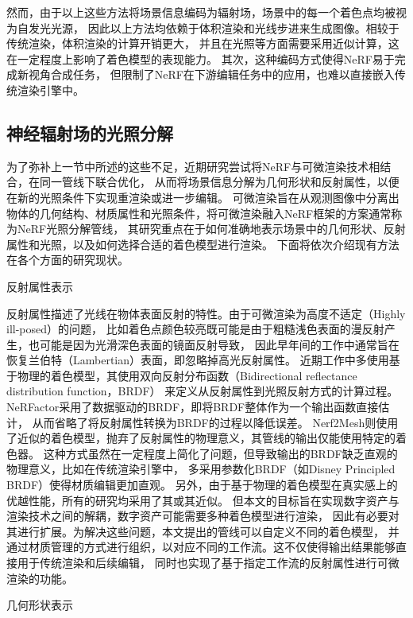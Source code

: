 然而，由于以上这些方法将场景信息编码为辐射场，场景中的每一个着色点均被视为自发光光源，
因此以上方法均依赖于体积渲染和光线步进来生成图像。相较于传统渲染，体积渲染的计算开销更大，
并且在光照等方面需要采用近似计算，这在一定程度上影响了着色模型的表现能力。
其次，这种编码方式使得NeRF易于完成新视角合成任务，
但限制了NeRF在下游编辑任务中的应用，也难以直接嵌入传统渲染引擎中。


\subsection{神经辐射场的光照分解}

为了弥补上一节中所述的这些不足，近期研究\cite{Zhang_2021,Boss_2021}尝试将NeRF与可微渲染技术相结合，在同一管线下联合优化，
从而将场景信息分解为几何形状和反射属性，以便在新的光照条件下实现重渲染或进一步编辑。
可微渲染旨在从观测图像中分离出物体的几何结构、材质属性和光照条件，将可微渲染融入NeRF框架的方案通常称为NeRF光照分解管线，
其研究重点在于如何准确地表示场景中的几何形状、反射属性和光照，以及如何选择合适的着色模型进行渲染。
下面将依次介绍现有方法在各个方面的研究现状。

反射属性表示

反射属性描述了光线在物体表面反射的特性。由于可微渲染为高度不适定（Highly ill-posed）的问题，
比如着色点颜色较亮既可能是由于粗糙浅色表面的漫反射产生，也可能是因为光滑深色表面的镜面反射导致，
因此早年间的工作\cite{Sato_1997, Zollh_fer_2015}中通常旨在恢复兰伯特（Lambertian）表面，即忽略掉高光反射属性。
近期工作中多使用基于物理的着色模型，其使用双向反射分布函数（Bidirectional reflectance distribution function，BRDF）
\cite{Cook_1981}来定义从反射属性到光照反射方式的计算过程。
NeRFactor\cite{zhang2021nerfactor}采用了数据驱动的BRDF，即将BRDF整体作为一个输出函数直接估计，
从而省略了将反射属性转换为BRDF的过程以降低误差。
Nerf2Mesh\cite{Tang_2023}则使用了近似的着色模型，抛弃了反射属性的物理意义，其管线的输出仅能使用特定的着色器。
这种方式虽然在一定程度上简化了问题，但导致输出的BRDF缺乏直观的物理意义，比如在传统渲染引擎中，
多采用参数化BRDF（如Disney Principled BRDF\cite{burley2012physically}）使得材质编辑更加直观。
另外，由于基于物理的着色模型在真实感上的优越性能，所有的研究均采用了其或其近似。
但本文的目标旨在实现数字资产与渲染技术之间的解耦，数字资产可能需要多种着色模型进行渲染，
因此有必要对其进行扩展。为解决这些问题，本文提出的管线可以自定义不同的着色模型，
并通过材质管理的方式进行组织，以对应不同的工作流。这不仅使得输出结果能够直接用于传统渲染和后续编辑，
同时也实现了基于指定工作流的反射属性进行可微渲染的功能。

几何形状表示

